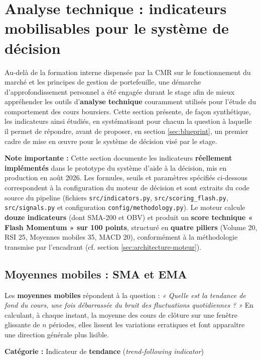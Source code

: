 \documentclass{rapportENSIAS} %
\begin{document}
\section{Analyse technique : indicateurs mobilisables pour le système de décision}
\label{sec:indicateurs}

\noindent
Au-delà de la formation interne dispensée par la CMR sur le fonctionnement du marché et les principes de gestion de portefeuille, une démarche d'approfondissement personnel a été engagée durant le stage afin de mieux appréhender les outils d'\textbf{analyse technique} couramment utilisés pour l'étude du comportement des cours boursiers. Cette section présente, de façon synthétique, les indicateurs ainsi étudiés, en systématisant pour chacun la question à laquelle il permet de répondre, avant de proposer, en section \ref{sec:blueprint}, un premier cadre de mise en \oe uvre pour le système de décision visé par le stage.

\vspace{0.3cm}
\noindent
\textbf{Note importante :} Cette section documente les indicateurs \textbf{réellement implémentés} dans le prototype du système d'aide à la décision, mis en production en août 2026. Les formules, seuils et paramètres spécifiés ci-dessous correspondent à la configuration du moteur de décision et sont extraits du code source du pipeline (fichiers \texttt{src/indicators.py}, \texttt{src/scoring\_flash.py}, \texttt{src/signals.py} et configuration \texttt{config/methodology.py}). Le moteur calcule \textbf{douze indicateurs} (dont SMA-200 et OBV) et produit un \textbf{score technique « Flash Momentum » sur 100 points}, structuré en \textbf{quatre piliers} (Volume 20, RSI 25, Moyennes mobiles 35, MACD 20), conformément à la méthodologie transmise par l'encadrant (cf. section \ref{sec:architecture-moteur}).

\subsection{Moyennes mobiles : SMA et EMA}

\noindent
Les \textbf{moyennes mobiles} répondent à la question : \textit{« Quelle est la tendance de fond du cours, une fois débarrassée du bruit des fluctuations quotidiennes ? »} En calculant, à chaque instant, la moyenne des cours de clôture sur une fenêtre glissante de $n$ périodes, elles lissent les variations erratiques et font apparaître une direction générale plus lisible.

\vspace{0.2cm}
\noindent
\textbf{Catégorie :} Indicateur de \textbf{tendance} (\textit{trend-following indicator})
\end{document}
